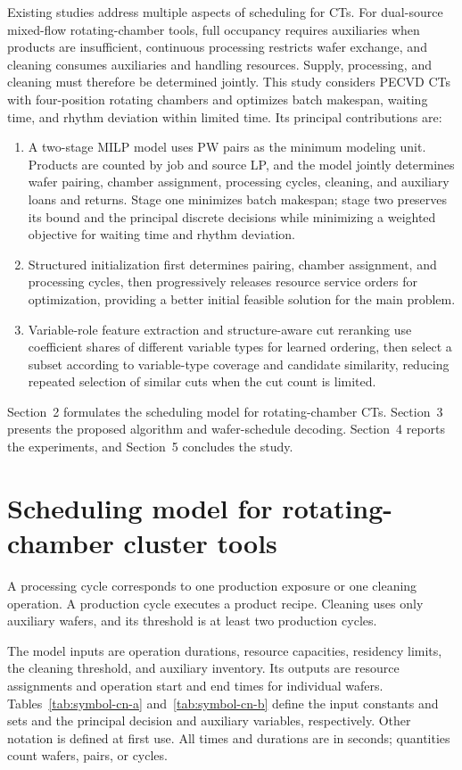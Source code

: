 \documentclass[final,5p,times,twocolumn]{elsarticle}
\newcounter{algorithm}
\begin{document}
Existing studies address multiple aspects of scheduling for CTs. For dual-source mixed-flow rotating-chamber tools, full occupancy requires auxiliaries when products are insufficient, continuous processing restricts wafer exchange, and cleaning consumes auxiliaries and handling resources. Supply, processing, and cleaning must therefore be determined jointly. This study considers PECVD CTs with four-position rotating chambers and optimizes batch makespan, waiting time, and rhythm deviation within limited time. Its principal contributions are:
\begin{enumerate}[leftmargin=*]
\item A two-stage MILP model uses PW pairs as the minimum modeling unit. Products are counted by job and source LP, and the model jointly determines wafer pairing, chamber assignment, processing cycles, cleaning, and auxiliary loans and returns. Stage one minimizes batch makespan; stage two preserves its bound and the principal discrete decisions while minimizing a weighted objective for waiting time and rhythm deviation.
\item Structured initialization first determines pairing, chamber assignment, and processing cycles, then progressively releases resource service orders for optimization, providing a better initial feasible solution for the main problem.
\item Variable-role feature extraction and structure-aware cut reranking use coefficient shares of different variable types for learned ordering, then select a subset according to variable-type coverage and candidate similarity, reducing repeated selection of similar cuts when the cut count is limited.
\end{enumerate}
Section~2 formulates the scheduling model for rotating-chamber CTs. Section~3 presents the proposed algorithm and wafer-schedule decoding. Section~4 reports the experiments, and Section~5 concludes the study.

\section{Scheduling model for rotating-chamber cluster tools}
\setcounter{equation}{0}
A processing cycle corresponds to one production exposure or one cleaning operation. A production cycle executes a product recipe. Cleaning uses only auxiliary wafers, and its threshold is at least two production cycles.

The model inputs are operation durations, resource capacities, residency limits, the cleaning threshold, and auxiliary inventory. Its outputs are resource assignments and operation start and end times for individual wafers. Tables~\ref{tab:symbol-cn-a} and~\ref{tab:symbol-cn-b} define the input constants and sets and the principal decision and auxiliary variables, respectively. Other notation is defined at first use. All times and durations are in seconds; quantities count wafers, pairs, or cycles.
\end{document}
